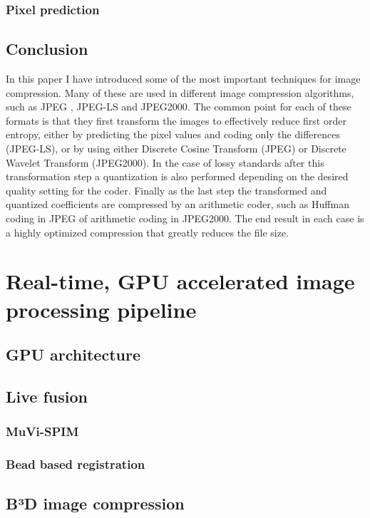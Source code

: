 \documentclass{diploma_style}
\begin{document}
\subsection{Pixel prediction}



\section{Conclusion}
In this paper I have introduced some of the most important techniques for image compression. Many of these are used in different image compression algorithms, such as JPEG \cite{pennebaker_jpeg:_1992}, JPEG-LS \cite{weinberger_loco-i_2000} and JPEG2000. The common point for each of these formats is that they first transform the images to effectively reduce first order entropy, either by predicting the pixel values and coding only the differences (JPEG-LS), or by using either Discrete Cosine Transform (JPEG) or Discrete Wavelet Transform (JPEG2000). In the case of lossy standards after this transformation step a quantization is also performed depending on the desired quality setting for the coder. Finally as the last step the transformed and quantized coefficients are compressed by an arithmetic coder, such as Huffman coding in JPEG of arithmetic coding in JPEG2000. The end result in each case is a highly optimized compression that greatly reduces the file size.




\chapter{Real-time, GPU accelerated image processing pipeline}
\section{GPU architecture}

\section{Live fusion}
	\subsection{MuVi-SPIM}
	\subsection{Bead based registration}

\section{B³D image compression}
\end{document}
